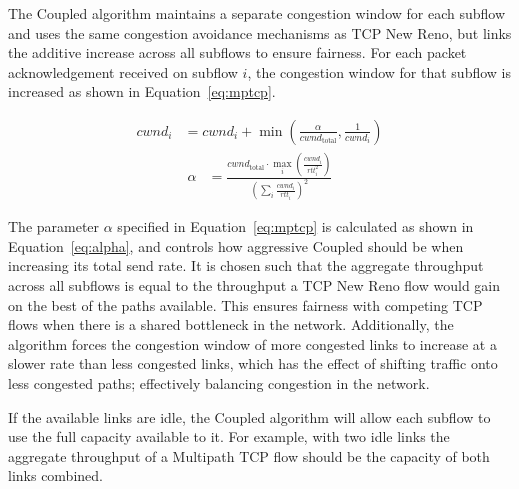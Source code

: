The Coupled algorithm maintains a separate congestion window for each subflow
and uses the same congestion avoidance mechanisms as TCP New Reno, but links the
additive increase across all subflows to ensure fairness. For each packet
acknowledgement received on subflow $i$, the congestion window for that subflow
is increased as shown in Equation~\ref{eq:mptcp}.

\begin{align}
  cwnd_i &= cwnd_i +
    \min\left(\frac{\alpha}{cwnd_\text{total}}, \frac{1}{cwnd_i}\right)\label{eq:mptcp}
\end{align}
\begin{align}
  \alpha &=
    \frac{cwnd_\text{total} \cdot \max_i\left(\frac{cwnd_i}{rtt_i^2}\right)}
         {(\sum_i \frac{cwnd_i}{rtt_i})^2}\label{eq:alpha}
\end{align}

The parameter $\alpha$ specified in Equation~\ref{eq:mptcp} is calculated as
shown in Equation~\ref{eq:alpha}, and controls how aggressive Coupled should be
when increasing its total send rate. It is chosen such that the aggregate
throughput across all subflows is equal to the throughput a TCP New Reno flow
would gain on the best of the paths available. This ensures fairness with
competing TCP flows when there is a shared bottleneck in the network.
Additionally, the algorithm forces the congestion window of more congested links
to increase at a slower rate than less congested links, which has the effect of
shifting traffic onto less congested paths; effectively balancing congestion in
the network.

If the available links are idle, the Coupled algorithm will allow each subflow
to use the full capacity available to it. For example, with two idle links the
aggregate throughput of a Multipath TCP flow should be the capacity of both
links combined.

